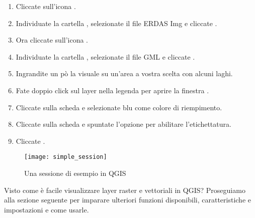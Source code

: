 
\begin{enumerate}
\item Cliccate sull'icona . 
\item Individuate la cartella ,
selezionate il file ERDAS Img  e cliccate
. 
\item Ora cliccate sull'icona . 
\item Individuate la cartella , selezionate
il file GML  e cliccate . 
\item Ingrandite un pò la visuale su un'area a vostra scelta con alcuni laghi. 
\item Fate doppio click sul layer  nella legenda per
aprire la finestra . 
\item Cliccate sulla scheda  e selezionate blu come
colore di riempimento. 
\item Cliccate sulla scheda  e spuntate l'opzione  per abilitare l'etichettatura. 
\item Cliccate .
\end{enumerate} 

\begin{figure}[ht]
   \begin{center}
   \caption{Una sessione di esempio in QGIS \nixcaption}\label{fig:simple_session}\smallskip
   \texttt{[image: simple\_session]}
\end{center}  
\end{figure}

Visto come è facile visualizzare layer raster e vettoriali in QGIS?
Proseguiamo alla sezione seguente per imparare ulteriori funzioni
disponibili, caratteristiche e impostazioni e come usarle.
